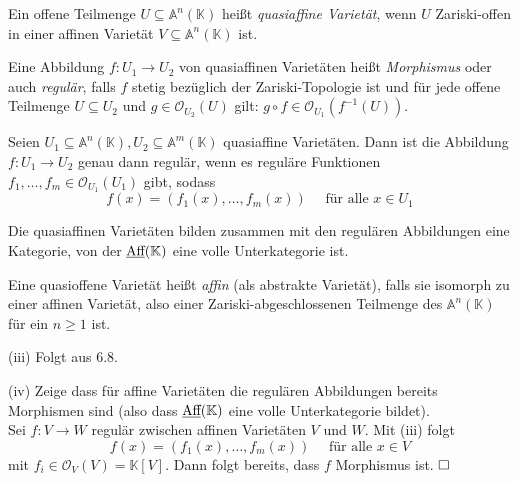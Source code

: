 \documentclass[11pt]{book}
\theoremstyle{nonumberbreak}
\newenvironment{pr}[1][]{\ifthenelse{\equal{#1}{}}{\proof}{\proof[#1]}\rm}{\endproof}
\newenvironment{definbem}[1][]{\ifthenelse{\equal{#1}{}}{\definibem}{\definibem[#1]}\rm}{\enddefinibem}
\begin{document}
\begin{spacing}{1.3}
\begin{definbem} %
\begin{compactenum}
\item Ein offene Teilmenge $U \subseteq \mathbb{A}^n(\mathbb{K})$ heißt \textit{quasiaffine Varietät}, wenn $U$ Zariski-offen in einer affinen Varietät $V \subseteq \mathbb{A}^n(\mathbb{K})$ ist.
\item Eine Abbildung $f: U_1 \longrightarrow U_2$ von quasiaffinen Varietäten heißt \textit{Morphismus} oder auch \textit{regulär}, falls $f$ stetig bezüglich der Zariski-Topologie ist und für jede offene Teilmenge $U \subseteq U_2$ und $g \in \mathcal{O}_{U_2}(U)$ gilt: $g \circ f \in \mathcal{O}_{U_1}(f^{-1}(U))$.
\item Seien $U_1 \subseteq \mathbb{A}^n(\mathbb{K}), U_2 \subseteq \mathbb{A}^m(\mathbb{K})$ quasiaffine Varietäten. Dann ist die Abbildung $f:U_1 \longrightarrow U_2$ genau dann regulär, wenn es reguläre Funktionen $f_1, \ldots, f_m \in \mathcal{O}_{U_1}(U_1)$ gibt, sodass
$$f(x)= \left(f_1(x), \ldots, f_m(x) \right) \quad \textrm{ für alle } x \in U_1$$
\item Die quasiaffinen Varietäten bilden zusammen mit den regulären Abbildungen eine Kategorie, von der $\textrm{\underline{Aff}}(\mathbb{K})$ eine volle Unterkategorie ist.
\item  Eine quasioffene Varietät heißt \textit{affin} (als abstrakte Varietät), falls sie isomorph zu einer affinen Varietät, also einer Zariski-abgeschlossenen Teilmenge des $\mathbb{A}^n(\mathbb{K})$ für ein $n \geqslant 1$ ist.
\end{compactenum}
\begin{pr}
\begin{compactenum}
\item[(iii)] Folgt aus 6.8.
\item[(iv)] Zeige dass für affine Varietäten die regulären Abbildungen bereits Morphismen sind (also dass $\textrm{\underline{Aff}}(\mathbb{K})$ eine volle Unterkategorie bildet). \\
Sei $f: V \longrightarrow W$ regulär zwischen affinen Varietäten $V$ und $W$. Mit (iii) folgt
$$f(x)= \left(f_1(x), \ldots, f_m(x) \right) \quad \textrm{ für alle } x \in V$$
mit $f_i \in \mathcal{O}_V(V)=\mathbb{K}[V]$. Dann folgt bereits, dass $f$ Morphismus ist. $\hfill \Box$
\end{compactenum}
\end{pr}
\end{definbem}



\end{spacing}
\end{document}
